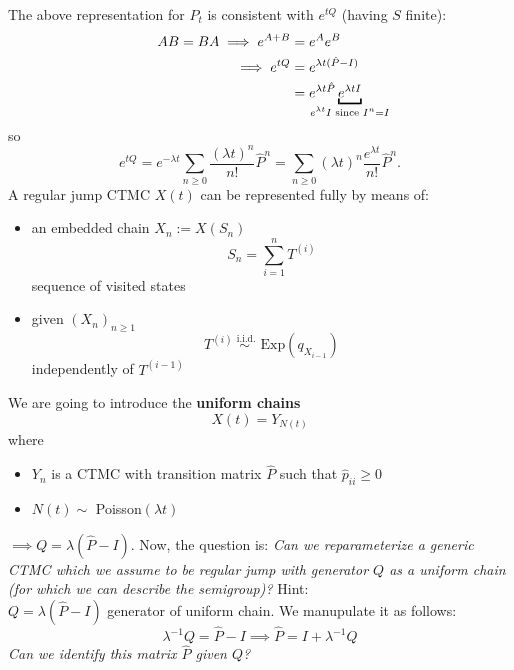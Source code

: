 \documentclass{article}
\begin{document}
The above representation for $P_t$ is consistent with $e^{tQ}$ (having $S$ finite):
\begin{align*}
	AB=BA\implies e^{A+B}&=e^Ae^B \\
	\implies e^{tQ}&=e^{\lambda t(\hat{P}-I)} \\
	&=e^{\lambda t \hat{P}}\underbracket{e^{\lambda t I}}_{\mathclap{e^{\lambda t}I\text{ since }I^n=I}}
\end{align*}
so
\[
e^{tQ}=e^{-\lambda t}\sum_{n\geqslant 0}\frac{(\lambda t)^n}{n!}\hat{P}^n=\sum_{n\geqslant 0}(\lambda t)^n\frac{e^{\lambda t}}{n!}\hat{P}^n.
\]
A regular jump CTMC $X(t)$ can be represented fully by means of:
\begin{itemize}
	\item an embedded chain $X_n := X(S_n)$
	\begin{equation*}
		S_n = \sum_{i = 1}^n T^{(i)}
	\end{equation*}
	sequence of visited states
	\item given $(X_n)_{n \geq 1}$
	\begin{equation*}
		T^{(i)} \stackrel{\text{ i.i.d.}}\sim \text{ Exp}(q_{X_{i-1}})
	\end{equation*}
	independently of $T^{(i-1)}$
\end{itemize}
We are going to introduce the \textbf{uniform chains} 
\begin{equation*}
	X(t) = Y_{N(t)}
\end{equation*}
where
\begin{itemize}
	\item $Y_n$ is a CTMC with transition matrix $\hat{P}$ such that $\hat{p}_{ii} \geq 0$
	\item $N(t) \sim$ Poisson$(\lambda t)$
\end{itemize}
$\implies Q = \lambda (\hat{P} - I)$.
Now, the question is: \textit{Can we reparameterize a generic CTMC which we assume to be regular }\textit{jump with generator $Q$ as a uniform chain (for which we can describe the semigroup)?} Hint:\\
$Q = \lambda (\hat{P} - I)$ generator of uniform chain.
We manupulate it as follows:
\begin{equation*}
	\lambda^{-1} Q = \hat{P} - I \implies \hat{P} = I + \lambda^{-1} Q 
\end{equation*} 
\textit{Can we identify this matrix $\hat{P}$ given $Q$?}\\
\end{document}
